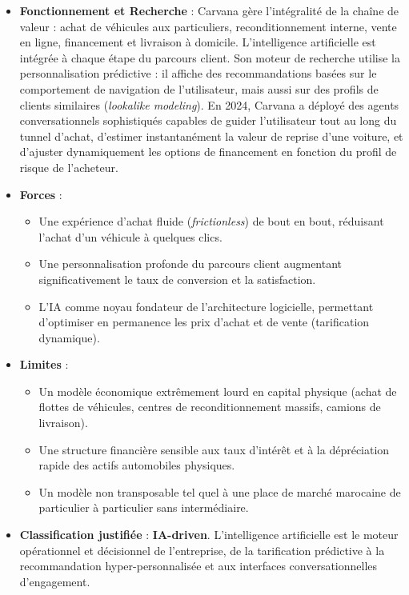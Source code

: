\documentclass[11pt,a4paper]{article}
\begin{document}
\begin{itemize}
    \item \textbf{Fonctionnement et Recherche} : Carvana gère l'intégralité de la chaîne de valeur : achat de véhicules aux particuliers, reconditionnement interne, vente en ligne, financement et livraison à domicile. L'intelligence artificielle est intégrée à chaque étape du parcours client. Son moteur de recherche utilise la personnalisation prédictive : il affiche des recommandations basées sur le comportement de navigation de l'utilisateur, mais aussi sur des profils de clients similaires (\textit{lookalike modeling}). En 2024, Carvana a déployé des agents conversationnels sophistiqués capables de guider l'utilisateur tout au long du tunnel d'achat, d'estimer instantanément la valeur de reprise d'une voiture, et d'ajuster dynamiquement les options de financement en fonction du profil de risque de l'acheteur.
    \item \textbf{Forces} :
    \begin{itemize}
        \item Une expérience d'achat fluide (\textit{frictionless}) de bout en bout, réduisant l'achat d'un véhicule à quelques clics.
        \item Une personnalisation profonde du parcours client augmentant significativement le taux de conversion et la satisfaction.
        \item L'IA comme noyau fondateur de l'architecture logicielle, permettant d'optimiser en permanence les prix d'achat et de vente (tarification dynamique).
    \end{itemize}
    \item \textbf{Limites} :
    \begin{itemize}
        \item Un modèle économique extrêmement lourd en capital physique (achat de flottes de véhicules, centres de reconditionnement massifs, camions de livraison).
        \item Une structure financière sensible aux taux d'intérêt et à la dépréciation rapide des actifs automobiles physiques.
        \item Un modèle non transposable tel quel à une place de marché marocaine de particulier à particulier sans intermédiaire.
    \end{itemize}
    \item \textbf{Classification justifiée} : \textbf{IA-driven}. L'intelligence artificielle est le moteur opérationnel et décisionnel de l'entreprise, de la tarification prédictive à la recommandation hyper-personnalisée et aux interfaces conversationnelles d'engagement.
\end{itemize}
\end{document}
